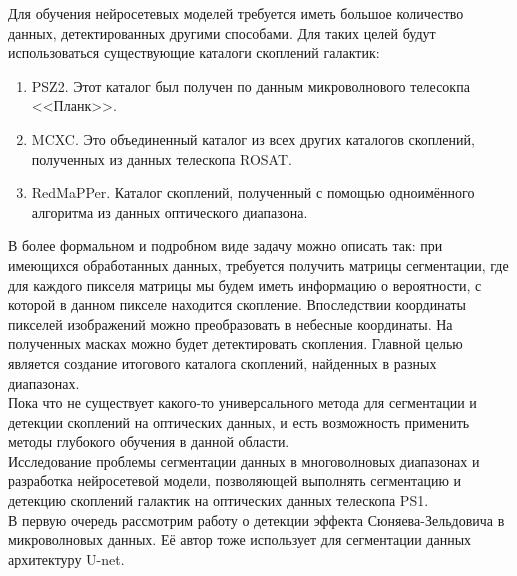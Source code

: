 \documentclass{article}
\begin{document}
Для обучения нейросетевых моделей требуется иметь большое количество данных, детектированных другими
способами. Для таких целей будут использоваться существующие каталоги скоплений галактик:

\begin{enumerate}
	\item PSZ2. Этот каталог был получен по данным микроволнового телесокпа <<Планк>>.
	\item MCXC. Это объединенный каталог из всех 
	других каталогов скоплений, полученных из данных телескопа ROSAT.
	\item RedMaPPer. Каталог скоплений, 
	полученный с помощью одноимённого алгоритма из данных оптического диапазона.
\end{enumerate}

В более формальном и подробном виде задачу можно описать так: при имеющихся обработанных данных, 
требуется получить матрицы сегментации, где для каждого пикселя 
матрицы мы будем иметь информацию о вероятности, с которой в данном пикселе находится скопление. 
Впоследствии координаты пикселей изображений можно преобразовать в небесные координаты. На полученных 
масках можно будет детектировать скопления. Главной целью является создание итогового каталога 
скоплений, найденных в разных диапазонах.\\

Пока что не существует какого-то универсального метода для сегментации и детекции скоплений 
на оптических данных, и есть возможность применить методы глубокого обучения в данной области.\\

Исследование проблемы сегментации данных в многоволновых диапазонах и разработка нейросетевой 
модели, позволяющей выполнять сегментацию и детекцию скоплений галактик на оптических данных телескопа PS1.\\


В первую очередь рассмотрим работу о детекции эффекта Сюняева-Зельдовича в 
микроволновых данных. Её автор тоже использует для сегментации данных архитектуру U-net. \\
\end{document}
